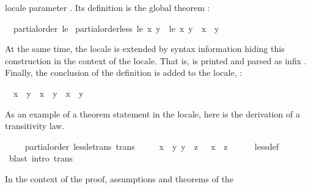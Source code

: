 \begin{isabellebody}
\begin{isamarkuptext}
  locale parameter .  Its definition is the global theorem
  :
  \begin{isabelle}%
\ \ partial{\isacharunderscore}order\ {\isacharquery}le\ {\isasymLongrightarrow}\isanewline
\isaindent{\ \ }partial{\isacharunderscore}order{\isachardot}less\ {\isacharquery}le\ {\isacharquery}x\ {\isacharquery}y\ {\isacharequal}\ {\isacharparenleft}{\isacharquery}le\ {\isacharquery}x\ {\isacharquery}y\ {\isasymand}\ {\isacharquery}x\ {\isasymnoteq}\ {\isacharquery}y{\isacharparenright}%
\end{isabelle}
  At the same time, the locale is extended by syntax information
  hiding this construction in the context of the locale.  That is,
   is printed and parsed as infix
  \isa{{\isasymsqsubset}}.  Finally, the conclusion of the definition is added to
  the locale, :
  \begin{isabelle}%
\ \ {\isacharparenleft}{\isacharquery}x\ {\isasymsqsubset}\ {\isacharquery}y{\isacharparenright}\ {\isacharequal}\ {\isacharparenleft}{\isacharquery}x\ {\isasymsqsubseteq}\ {\isacharquery}y\ {\isasymand}\ {\isacharquery}x\ {\isasymnoteq}\ {\isacharquery}y{\isacharparenright}%
\end{isabelle}%
\end{isamarkuptext}%
\isamarkuptrue%
%
\begin{isamarkuptext}%
As an example of a theorem statement in the locale, here is the
  derivation of a transitivity law.%
\end{isamarkuptext}%
\isamarkuptrue%
\ \ \isamarkupfalse%
\ {\isacharparenleft}\ partial{\isacharunderscore}order{\isacharparenright}\ less{\isacharunderscore}le{\isacharunderscore}trans\ {\isacharbrackleft}trans{\isacharbrackright}{\isacharcolon}\isanewline
\ \ \ \ {\isachardoublequoteopen}{\isasymlbrakk}\ x\ {\isasymsqsubset}\ y{\isacharsemicolon}\ y\ {\isasymsqsubseteq}\ z\ {\isasymrbrakk}\ {\isasymLongrightarrow}\ x\ {\isasymsqsubset}\ z{\isachardoublequoteclose}\isanewline
%
\isadelimvisible
\ \ \ \ %
\endisadelimvisible
%
\isatagvisible
{}\isamarkupfalse%
\ less{\isacharunderscore}def\ \isamarkupfalse%
\ {\isacharparenleft}blast\ intro{\isacharcolon}\ trans{\isacharparenright}%
\endisatagvisible
{\isafoldvisible}%
%
\isadelimvisible
%
\endisadelimvisible
%
\begin{isamarkuptext}%
In the context of the proof, assumptions and theorems of the

\end{isamarkuptext}
\end{isabellebody}
